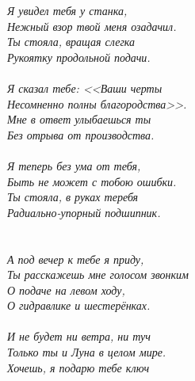 \vspace{0.75cm}
\noindent\textit{%
\hspace*{2.7cm}Я увидел тебя у станка,\\
\hspace*{2.7cm}Нежный взор твой меня озадачил.\\
\hspace*{2.7cm}Ты стояла, вращая слегка\\
\hspace*{2.7cm}Рукоятку продольной подачи.\\
\\
\hspace*{2.7cm}Я сказал тебе: <<Ваши черты\\
\hspace*{2.7cm}Несомненно полны благородства>>.\\
\hspace*{2.7cm}Мне в ответ улыбаешься ты\\
\hspace*{2.7cm}Без отрыва от производства.\\
\\
\hspace*{2.7cm}Я теперь без ума от тебя,\\
\hspace*{2.7cm}Быть не может с тобою ошибки.\\
\hspace*{2.7cm}Ты стояла, в руках теребя\\
\hspace*{2.7cm}Радиально-упорный подшипник.\\
\\
\\
\hspace*{2.7cm}А под вечер к тебе я приду,\\
\hspace*{2.7cm}Ты расскажешь мне голосом звонким\\
\hspace*{2.7cm}О подаче на левом ходу,\\
\hspace*{2.7cm}О гидравлике и шестерёнках.\\
\\
\hspace*{2.7cm}И не будет ни ветра, ни туч\mdash\\
\hspace*{2.7cm}Только ты и Луна в целом мире.\\
\hspace*{2.7cm}Хочешь, я подарю тебе ключ\\
}
